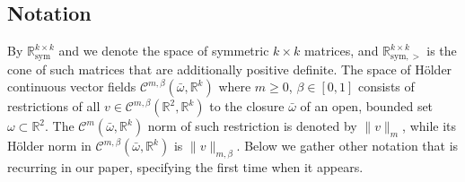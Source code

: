 \documentclass[reqno,twoside,11pt]{amsart}
\newcommand{\sym}{\mathrm{sym}}
\newcommand{\R}{\mathbb{R}}
\numberwithin{equation}{section}
\theoremstyle{plain}
\theoremstyle{definition}
\begin{document}
\subsection{Notation} By $\mathbb{R}^{k\times k}_{\sym}$ and
we denote the space of symmetric $k\times k$ matrices, and
$\mathbb{R}^{k\times k}_{\sym,>}$ is the cone of such matrices that
are additionally positive definite. The space of H\"older continuous vector fields
$\mathcal{C}^{m,\beta}(\bar\omega,\R^k)$ where $m\geq 0$, $\beta\in
[0,1]$ consists of restrictions of
all $v\in \mathcal{C}^{m,\beta}(\mathbb{R}^2,\R^k)$ to the closure
$\bar\omega$ of an open, bounded set $\omega\subset\R^2$. The
$\mathcal{C}^m(\bar\omega,\R^k)$ norm of such restriction is
denoted by $\|v\|_m$, while its H\"older norm in $\mathcal{C}^{m,
  \beta}(\bar\omega,\R^k)$ is $\|v\|_{m,\beta}$. Below we gather
other  notation that is recurring in our paper, specifying the first time
when it appears.

\smallskip
\end{document}
